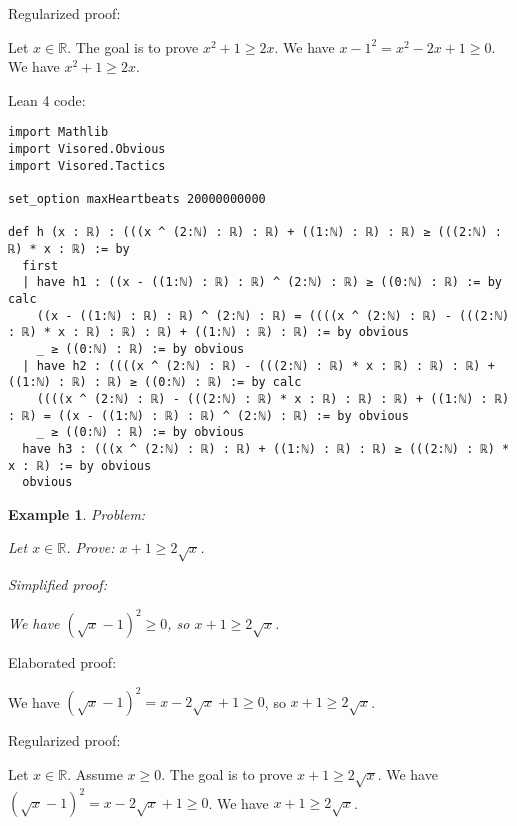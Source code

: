 \documentclass{article}
\newtheorem{example}{Example}
\begin{document}
Regularized proof:
\begin{tcolorbox}[colback=red!10, width=\linewidth]
Let $x\in\mathbb{R}$.
The goal is to prove $x^2 + 1 \ge 2x$.
We have ${{x-1}}^2 = x^2 - 2x + 1 \ge 0$.
We have $x^2 + 1 \ge 2x$.
\end{tcolorbox}

Lean 4 code:
\begin{tcolorbox}[colback=white!10, width=\linewidth]
\begin{lstlisting}[language=Lean4]
import Mathlib
import Visored.Obvious
import Visored.Tactics

set_option maxHeartbeats 20000000000

def h (x : ℝ) : (((x ^ (2:ℕ) : ℝ) : ℝ) + ((1:ℕ) : ℝ) : ℝ) ≥ (((2:ℕ) : ℝ) * x : ℝ) := by
  first
  | have h1 : ((x - ((1:ℕ) : ℝ) : ℝ) ^ (2:ℕ) : ℝ) ≥ ((0:ℕ) : ℝ) := by calc
    ((x - ((1:ℕ) : ℝ) : ℝ) ^ (2:ℕ) : ℝ) = ((((x ^ (2:ℕ) : ℝ) - (((2:ℕ) : ℝ) * x : ℝ) : ℝ) : ℝ) + ((1:ℕ) : ℝ) : ℝ) := by obvious
    _ ≥ ((0:ℕ) : ℝ) := by obvious
  | have h2 : ((((x ^ (2:ℕ) : ℝ) - (((2:ℕ) : ℝ) * x : ℝ) : ℝ) : ℝ) + ((1:ℕ) : ℝ) : ℝ) ≥ ((0:ℕ) : ℝ) := by calc
    ((((x ^ (2:ℕ) : ℝ) - (((2:ℕ) : ℝ) * x : ℝ) : ℝ) : ℝ) + ((1:ℕ) : ℝ) : ℝ) = ((x - ((1:ℕ) : ℝ) : ℝ) ^ (2:ℕ) : ℝ) := by obvious
    _ ≥ ((0:ℕ) : ℝ) := by obvious
  have h3 : (((x ^ (2:ℕ) : ℝ) : ℝ) + ((1:ℕ) : ℝ) : ℝ) ≥ (((2:ℕ) : ℝ) * x : ℝ) := by obvious
  obvious

\end{lstlisting}
\end{tcolorbox}


\begin{example}
Problem:
\begin{tcolorbox}[colback=yellow!10, width=\linewidth]
Let $x\in\mathbb{R}$. Prove: $x + 1 \ge 2\sqrt{x}$.
\end{tcolorbox}

Simplified proof:
\begin{tcolorbox}[colback=blue!10, width=\linewidth]
We have $(\sqrt{x}-1)^2 \ge 0$, so $x+1 \ge 2\sqrt{x}$.
\end{tcolorbox}
\end{example}

Elaborated proof:
\begin{tcolorbox}[colback=green!10, width=\linewidth]
We have $(\sqrt{x}-1)^2 = x - 2\sqrt{x} + 1 \ge 0$, so $x+1 \ge 2\sqrt{x}$.
\end{tcolorbox}

Regularized proof:
\begin{tcolorbox}[colback=red!10, width=\linewidth]
Let $x\in\mathbb{R}$.
Assume $x\ge 0$.
The goal is to prove $x+1 \ge 2\sqrt{x}$.
We have ${(\sqrt{x}-1)}^2 = x - 2\sqrt{x} + 1 \ge 0$.
We have $x+1 \ge 2\sqrt{x}$.
\end{tcolorbox}
\end{document}
